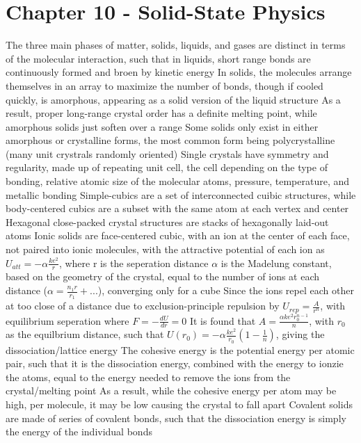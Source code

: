 \documentclass[11 pt, twoside]{article}
\newenvironment{outline*}
{
	\begin{outline}[enumerate]
	}
	{\end{outline}
}
\begin{document}
\section{Chapter 10 - Solid-State Physics}
\begin{outline*}
\1 The three main phases of matter, solids, liquids, and gases are distinct in terms of the molecular interaction, such that in liquids, short range bonds are continuously formed and broen by kinetic energy
	\2 In solids, the molecules arrange themselves in an array to maximize the number of bonds, though if cooled quickly, is amorphous, appearing as a solid version of the liquid structure
		\3 As a result, proper long-range crystal order has a definite melting point, while amorphous solids just soften over a range
		\3 Some solids only exist in either amorphous or crystalline forms, the most common form being polycrystalline (many unit crystrals randomly oriented)
	\2 Single crystals have symmetry and regularity, made up of repeating unit cell, the cell depending on the type of bonding, relative atomic size of the molecular atoms, pressure, temperature, and metallic bonding
		\3 Simple-cubics are a set of interconnected cuibic structures, while body-centered cubics are a subset with the same atom at each vertex and center
		\3 Hexagonal close-packed crystal structures are stacks of hexagonally laid-out atoms
	\2 Ionic solids are face-centered cubic, with an ion at the center of each face, not paired into ionic molecules, with the attractive potential of each ion as $U_{att} = -\alpha \frac{ke^2}{r}$, where r is the seperation distance
		\3 $\alpha$ is the Madelung constant, based on the geometry of the crystal, equal to the number of ions at each distance ($\alpha = \frac{n_1r}{r_1} + ...$), converging only for a cube
		\3 Since the ions repel each other at too close of a distance due to exclusion-principle repulsion by $U_{rep} = \frac{A}{r^n}$, with equilibrium seperation where $F = -\frac{dU}{dr} = 0$
			\4 It is found that $A = \frac{\alpha ke^2 r_0^{n - 1}}{n}$, with $r_0$ as the equilbrium distance, such that $U(r_0) = -\alpha\frac{ke^2}{r_0}(1 - \frac{1}{n})$, giving the dissociation/lattice energy
		\3 The cohesive energy is the potential energy per atomic pair, such that it is the dissociation energy, combined with the energy to ionzie the atoms, equal to the energy needed to remove the ions from the crystal/melting point
			\4 As a result, while the cohesive energy per atom may be high, per molecule, it may be low causing the crystal to fall apart
	\2 Covalent solids are made of series of covalent bonds, such that the dissociation energy is simply the energy of the individual bonds

\end{outline*}
\end{document}
